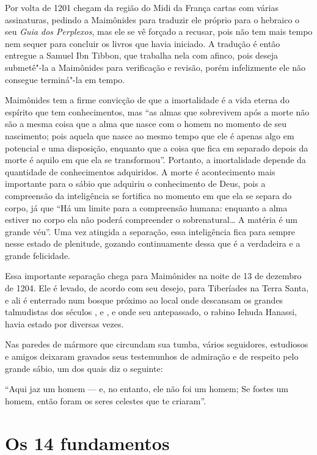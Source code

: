 Por volta de 1201 chegam da região do Midi da França cartas com várias
assinaturas, pedindo a Maimônides para traduzir ele próprio para o
hebraico o seu \emph{Guia dos Perplexos}, mas ele se vê forçado a
recusar, pois não tem mais tempo nem sequer para concluir os livros que
havia iniciado. A tradução é então entregue a Samuel Ibn Tibbon, que
trabalha nela com afinco, pois deseja submetê"-la a Maimônides para
verificação e revisão, porém infelizmente ele não consegue terminá"-la em
tempo.

Maimônides tem a firme convicção de que a imortalidade é a vida eterna
do espírito que tem conhecimentos, mas ``as almas que sobrevivem após a
morte não são a mesma coisa que a alma que nasce com o homem no momento
de seu nascimento; pois aquela que nasce ao mesmo tempo que ele é apenas
algo em potencial e uma disposição, enquanto que a coisa que fica em
separado depois da morte é aquilo em que ela se transformou''. Portanto,
a imortalidade depende da quantidade de conhecimentos adquiridos. A
morte é acontecimento mais importante para o sábio que adquiriu o
conhecimento de Deus, pois a compreensão da inteligência se fortifica no
momento em que ela se separa do corpo, já que ``Há um limite para a
compreensão humana: enquanto a alma estiver no corpo ela não poderá
compreender o sobrenatural\ldots{} A matéria é um grande véu''. Uma vez
atingida a separação, essa inteligência fica para sempre nesse estado
de plenitude, gozando continuamente dessa que é a verdadeira e a grande
felicidade.

Essa importante separação chega para Maimônides na noite
de 13 de dezembro de 1204. Ele é levado, de acordo
com seu desejo, para Tiberíades na Terra Santa, e ali é enterrado num
bosque próximo ao local onde descansam os grandes talmudistas dos
séculos ,  e , e onde seu antepassado, o rabino Iehuda Hanassi,
havia estado por diversas vezes.

Nas paredes de mármore que circundam sua tumba, vários seguidores,
estudiosos e amigos deixaram gravados seus testemunhos de admiração e de
respeito pelo grande sábio, um dos quais diz o seguinte:

``Aqui jaz um homem --- e, no entanto, ele não foi um homem; Se fostes
um homem, então foram os seres celestes que te criaram''.


\chapter{Os 14 fundamentos} 

